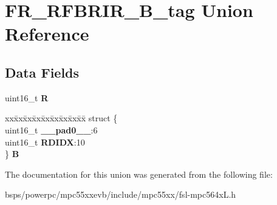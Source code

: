 \hypertarget{unionFR__RFBRIR__16B__tag}{}\section{F\+R\+\_\+\+R\+F\+B\+R\+I\+R\+\_\+B\+\_\+tag Union Reference}
\label{unionFR__RFBRIR__16B__tag}
\subsection*{Data Fields}
\begin{DoxyCompactItemize}
\item 
\mbox{\label{unionFR__RFBRIR__16B__tag_a7adb366758737332cb6f6ad60afc7d8a}} 
uint16\+\_\+t {\bfseries R}
\item 
\mbox{\label{unionFR__RFBRIR__16B__tag_acf3c9dfc82b79485c0a7508d1f1c28a3}} 
\begin{tabbing}
xx\=xx\=xx\=xx\=xx\=xx\=xx\=xx\=xx\=\kill
struct \{\\
\>uint16\_t {\bfseries \_\_pad0\_\_}:6\\
\>uint16\_t {\bfseries RDIDX}:10\\
\} {\bfseries B}\\

\end{tabbing}\end{DoxyCompactItemize}


The documentation for this union was generated from the following file\+:\begin{DoxyCompactItemize}
\item 
bsps/powerpc/mpc55xxevb/include/mpc55xx/fsl-\/mpc564x\+L.\+h\end{DoxyCompactItemize}
